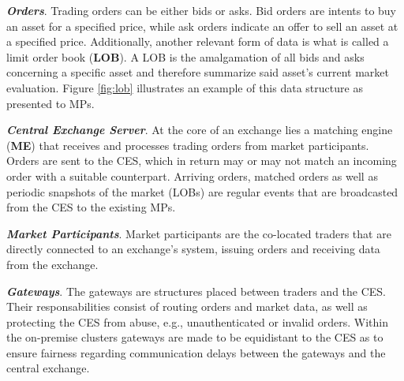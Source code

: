 \textbf{\textit{Orders}}. Trading orders can be either bids or asks. Bid orders
    are intents to buy an asset for a specified price, while ask orders indicate 
    an offer to sell an asset at a specified price. Additionally, another 
    relevant form of data is what is called a limit order book (\textbf{LOB}).
    A LOB is the amalgamation of all bids and asks concerning a specific asset and 
    therefore summarize said asset's current market evaluation. Figure \ref{fig:lob} 
    illustrates an example of this data structure as presented to MPs.

\textbf{\textit{Central Exchange Server}}. At the core of an exchange lies a 
    matching engine (\textbf{ME}) that receives and processes trading orders from 
    market participants. Orders are sent to the CES, which in return may or may not match 
    an incoming order with a suitable counterpart. Arriving orders, matched orders 
    as well as periodic snapshots of the market (LOBs) are regular events that are 
    broadcasted from the CES to the existing MPs.

\textbf{\textit{Market Participants}}. Market participants are the co-located 
    traders that are directly connected to an exchange's system, issuing orders and 
    receiving data from the exchange.


\textbf{\textit{Gateways}}. The gateways are structures placed between traders
    and the CES. Their responsabilities consist of routing orders and market data, as 
    well as protecting the CES from abuse, e.g., unauthenticated or invalid orders. Within
    the on-premise clusters gateways are made to be equidistant to the CES as to 
    ensure fairness regarding communication delays between the gateways and the 
    central exchange.

